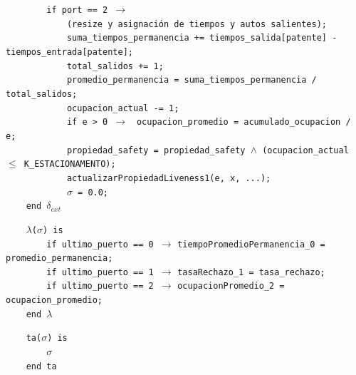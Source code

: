 \documentclass[12pt]{article}
\begin{document}
\begin{tcolorbox}[
    colback=black!5!white,
    colframe=black!80!white,
    boxrule=0.8pt,
    arc=2pt,
    left=5pt,
    right=5pt,
    top=5pt,
    bottom=5pt,
    fontupper=\ttfamily,
    breakable
]
\begin{flushleft}
\texttt{~~~~~~~~if port == 2 }\(\rightarrow\) \\
\texttt{~~~~~~~~~~~~(resize y asignación de tiempos y autos salientes);} \\
\texttt{~~~~~~~~~~~~suma\_tiempos\_permanencia += tiempos\_salida[patente] - tiempos\_entrada[patente];} \\
\texttt{~~~~~~~~~~~~total\_salidos += 1;} \\
\texttt{~~~~~~~~~~~~promedio\_permanencia = suma\_tiempos\_permanencia / total\_salidos;} \\
\texttt{~~~~~~~~~~~~ocupacion\_actual -= 1;} \\
\texttt{~~~~~~~~~~~~if e > 0 }\(\rightarrow\) \texttt{ ocupacion\_promedio = acumulado\_ocupacion / e;} \\
\texttt{~~~~~~~~~~~~propiedad\_safety = propiedad\_safety }\(\land\)\texttt{ (ocupacion\_actual }\(\leq\)\texttt{ K\_ESTACIONAMENTO);} \\
\texttt{~~~~~~~~~~~~actualizarPropiedadLiveness1(e, x, ...);} \\
\texttt{~~~~~~~~~~~~}$\sigma$\texttt{ = 0.0;} \\
\texttt{~~~~end }$\delta_{ext}$
\end{flushleft}

\begin{flushleft}
\texttt{~~~~}$\lambda$\texttt{(}$\sigma$\texttt{) is} \\
\texttt{~~~~~~~~if ultimo\_puerto == 0 }\(\rightarrow\) \texttt{tiempoPromedioPermanencia\_0 = promedio\_permanencia;} \\
\texttt{~~~~~~~~if ultimo\_puerto == 1 }\(\rightarrow\) \texttt{tasaRechazo\_1 = tasa\_rechazo;} \\
\texttt{~~~~~~~~if ultimo\_puerto == 2 }\(\rightarrow\) \texttt{ocupacionPromedio\_2 = ocupacion\_promedio;} \\
\texttt{~~~~end }$\lambda$
\end{flushleft}

\begin{flushleft}
\texttt{~~~~ta(}$\sigma$\texttt{) is} \\
\texttt{~~~~~~~~}$\sigma$ \\
\texttt{~~~~end ta}
\end{flushleft}


\end{tcolorbox}
\end{document}
